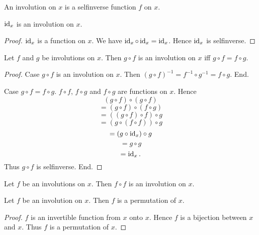 \documentclass[../../set-theory.ftl.tex]{subfiles}
\begin{document}
  \begin{forthel}
    \begin{definition}
      An involution on $x$ is a selfinverse function $f$ on $x$.
    \end{definition}

    \begin{proposition}\label{SetTheory_02_03_305935}
      $\operatorname{id}_{x}$ is an involution on $x$.
    \end{proposition}
    \begin{proof}
      $\operatorname{id}_{x}$ is a function on $x$.
      We have $\operatorname{id}_{x} \circ \operatorname{id}_{x} = \operatorname{id}_{x}$.
      Hence $\operatorname{id}_{x}$ is selfinverse.
    \end{proof}

    \begin{proposition}\label{SetTheory_02_03_610247}
      Let $f$ and $g$ be involutions on $x$.
      Then $g \circ f$ is an involution on $x$ iff $g \circ f = f \circ g$.
    \end{proposition}
    \begin{proof}
      Case $g \circ f$ is an involution on $x$.
        Then $(g \circ f)^{-1} = f^{-1} \circ g^{-1} = f \circ g$.
      End.

      Case $g \circ f = f \circ g$.
        $f \circ f$, $f \circ g$ and $f \circ g$ are functions on $x$.
        Hence
        \[   (g \circ f) \circ (g \circ f) \]
        \[ = (g \circ f) \circ (f \circ g) \]
        \[ = ((g \circ f) \circ f) \circ g \]
        \[ = (g \circ (f \circ f)) \circ g \]
        \[ = (g \circ \operatorname{id}_{x}) \circ g \]
        \[ = g \circ g \]
        \[ = \operatorname{id}_{x}. \]
        Thus $g \circ f$ is selfinverse.
      End.
    \end{proof}

    \begin{corollary}\label{SetTheory_02_03_310947}
      Let $f$ be an involutions on $x$.
      Then $f \circ f$ is an involution on $x$.
    \end{corollary}

    \begin{proposition}\label{SetTheory_02_03_280184}
      Let $f$ be an involution on $x$.
      Then $f$ is a permutation of $x$.
    \end{proposition}
    \begin{proof}
      $f$ is an invertible function from $x$ onto $x$.
      Hence $f$ is a bijection between $x$ and $x$.
      Thus $f$ is a permutation of $x$.
    \end{proof}
  \end{forthel}
\end{document}
